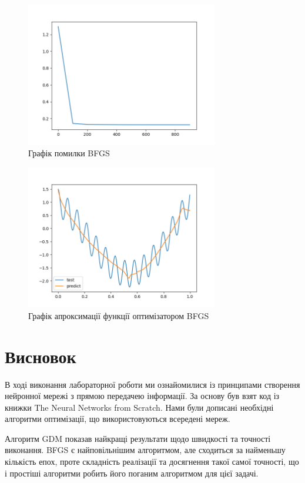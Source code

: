 \documentclass[a4paper,14pt]{extarticle}
\begin{document}
\begin{figure}[H]
    \centering
    \includegraphics[width=0.75\textwidth]{bfgs_loss.png}
    \caption{Графік помилки BFGS}
\end{figure}
\begin{figure}[H]
    \centering
    \includegraphics[width=0.75\textwidth]{bfgs_func.png}
    \caption{Графік апроксимації функції оптимізатором BFGS}
\end{figure}

\section*{Висновок}
В ході виконання лабораторної роботи ми ознайомилися із принципами створення нейронної мережі з прямою передачею інформації. За основу був взят код із
книжки The Neural Networks from Scratch. Нами були дописані необхідні алгоритми
оптимізації, що використовуються всередені мереж.

Алгоритм GDM показав найкращі результати щодо швидкості та точності виконання. BFGS є найповільнішим алгоритмом, але сходиться
за найменьшу кількість епох, проте складність реалізації
та досягнення такої самої точності, що і простіші алгоритми
робить його поганим алгоритмом для цієї задачі.
\end{document}
